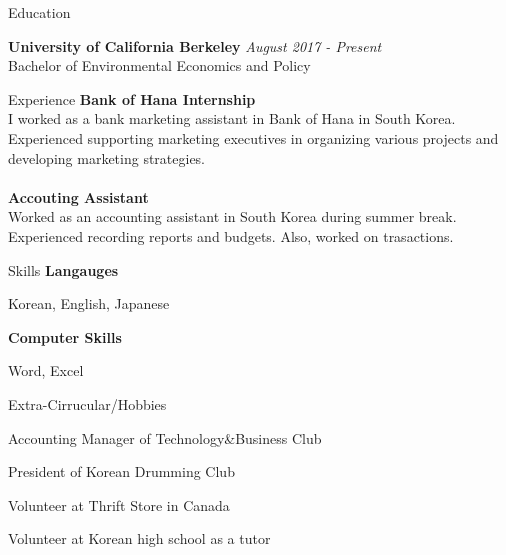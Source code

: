\documentclass{resume}
\begin{document}
\begin{rSection}{Education}

{\bf University of California Berkeley} \hfill {\em August 2017 - Present} 
\\ Bachelor of Environmental Economics and Policy



\end{rSection}


\begin{rSection}{Experience}
{\bf Bank of Hana Internship}
\\ I worked as a bank marketing assistant in Bank of Hana in South Korea. Experienced supporting marketing executives in organizing various projects and developing marketing strategies. \\
\\{\bf Accouting Assistant}
\\
Worked as an accounting assistant in South Korea during summer break. Experienced recording reports and budgets. Also, worked on trasactions.\\

\end{rSection}



\begin{rSection}{Skills} 
{\bf Langauges}
\item Korean, English, Japanese

{\bf Computer Skills}
\item Word, Excel 
\end{rSection}


\begin{rSection}{Extra-Cirrucular/Hobbies} \itemsep -3pt
\item Accounting Manager of Technology&Business Club
\item President of Korean Drumming Club
\item Volunteer at Thrift Store in Canada
\item Volunteer at Korean high school as a tutor


\end{rSection}
\end{document}

